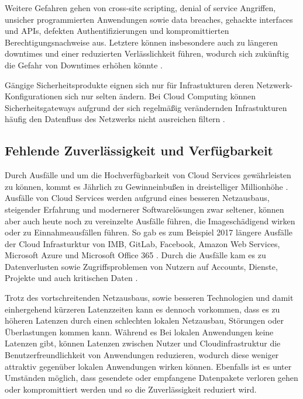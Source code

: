 Weitere Gefahren gehen von cross-site scripting, denial of service Angriffen, 
unsicher programmierten Anwendungen sowie 
data breaches, gehackte interfaces und APIs, defekten Authentifizierungen 
und kompromittierten Berechtigungsnachweise aus. 
Letztere können insbesondere auch zu längeren downtimes und einer reduzierten Verlässlichkeit führen, 
wodurch sich zukünftig die Gefahr von Downtimes erhöhen könnte \cite{jabbar2020}.

Gängige Sicherheitsprodukte eignen sich nur für Infrastukturen deren Netzwerk-Konfigurationen sich nur selten ändern. Bei Cloud Computing können Sicherheitsgateways aufgrund der sich regelmäßig verändernden Infrastukturen häufig  den Datenfluss des Netzwerks nicht ausreichen filtern \cite{wehrhahn-aklender2019}.

\subsection{Fehlende Zuverlässigkeit und Verfügbarkeit}
\label{sec:fehlende-Sicherheit}
Durch Ausfälle und um die Hochverfügbarkeit von Cloud Services gewährleisten zu können, 
kommt es Jährlich zu Gewinneinbußen in dreistelliger Millionhöhe \cite{snyder2015}.
Ausfälle von Cloud Services werden aufgrund eines besseren Netzausbaus, 
steigender Erfahrung und modernerer Softwarelösungen zwar seltener, 
können aber auch heute noch zu vereinzelte Ausfälle führen, die Imageschädigend wirken oder zu Einnahmeausfällen führen. 
So gab es zum Beispiel 2017 längere Ausfälle der Cloud Infrasturktur von 
IMB, GitLab, Facebook, Amazon Web Services, Microsoft Azure und Microsoft Office 365 \cite{tsidulko2017}.
Durch die Ausfälle kam es zu Datenverlusten sowie Zugriffsproblemen von Nutzern auf Accounts, 
Dienste, Projekte und auch kritischen Daten \cite{tsidulko2017}.

Trotz des vortschreitenden Netzausbaus, sowie besseren Technologien und damit einhergehend kürzeren Latenzzeiten kann es dennoch vorkommen, dass es zu höheren Latenzen durch einen schlechten lokalen Netzausbau, Störungen oder Überlastungen kommen kann.
Während es Bei lokalen Anwendungen keine Latenzen gibt, können Latenzen zwischen Nutzer und Cloudinfrastruktur die Benutzerfreundlichkeit von Anwendungen reduzieren, wodurch diese weniger attraktiv gegenüber lokalen Anwendungen wirken können.
Ebenfalls ist es unter Umständen möglich, dass gesendete oder empfangene Datenpakete verloren gehen oder kompromittiert werden und so die Zuverlässigkeit reduziert wird. 

